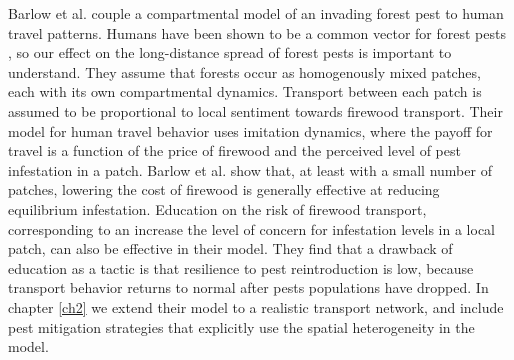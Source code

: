 Barlow et al. \cite{barlow2014modelling} couple a compartmental model of an invading forest pest to human travel patterns. Humans have been shown to be a common vector for forest pests \cite{buck2009hitchhiking,kolar2001progress,wilson2009something}, so our effect on the long-distance spread of forest pests is important to understand. They assume that forests occur as homogenously mixed patches, each with its own compartmental dynamics. Transport between each patch is assumed to be proportional to local sentiment towards firewood transport. Their model for human travel behavior uses imitation dynamics, where the payoff for travel is a function of the price of firewood and the perceived level of pest infestation in a patch. Barlow et al. show that, at least with a small number of patches, lowering the cost of firewood is generally effective at reducing equilibrium infestation. Education on the risk of firewood transport, corresponding to an increase the level of concern for infestation levels in a local patch, can also be effective in their model. They find that a drawback of education as a tactic is that resilience to pest reintroduction is low, because transport behavior returns to normal after pests populations have dropped. In chapter \ref{ch2} we extend their model to a realistic transport network, and include pest mitigation strategies that explicitly use the spatial heterogeneity in the model.  


